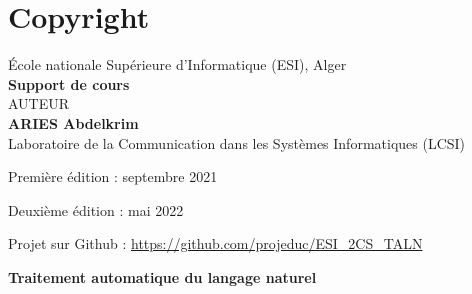 \documentclass[12pt]{book}
\begin{document}
\fi



\chapter*{Copyright}

\begin{center}
	École nationale Supérieure d'Informatique (ESI), Alger \\
	\textbf{Support de cours} \\[1cm]
	{\Large AUTEUR}\\[.5cm]
	{\LARGE\bfseries ARIES Abdelkrim}\\
	Laboratoire de la Communication dans les Systèmes Informatiques (LCSI)
\end{center}

Première édition : septembre 2021

Deuxième édition : mai 2022

Projet sur Github : \url{https://github.com/projeduc/ESI_2CS_TALN}


\begin{center}
	{\Huge \textbf{Traitement automatique du langage naturel}}
\end{center}
\end{document}
